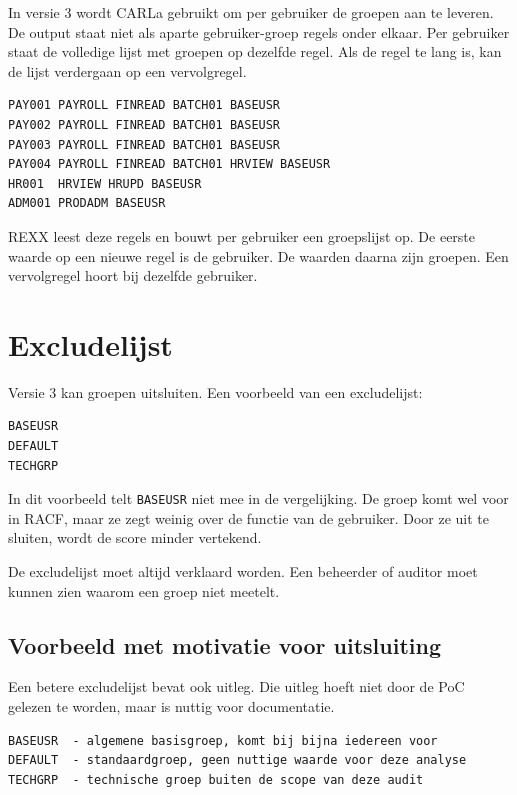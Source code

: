 In versie 3 wordt CARLa gebruikt om per gebruiker de groepen aan te leveren. De output staat niet als aparte gebruiker-groep regels onder elkaar. Per gebruiker staat de volledige lijst met groepen op dezelfde regel. Als de regel te lang is, kan de lijst verdergaan op een vervolgregel.

\begin{verbatim}
PAY001 PAYROLL FINREAD BATCH01 BASEUSR
PAY002 PAYROLL FINREAD BATCH01 BASEUSR
PAY003 PAYROLL FINREAD BATCH01 BASEUSR
PAY004 PAYROLL FINREAD BATCH01 HRVIEW BASEUSR
HR001  HRVIEW HRUPD BASEUSR
ADM001 PRODADM BASEUSR
\end{verbatim}

REXX leest deze regels en bouwt per gebruiker een groepslijst op. De eerste waarde op een nieuwe regel is de gebruiker. De waarden daarna zijn groepen. Een vervolgregel hoort bij dezelfde gebruiker.

\section{Excludelijst}

Versie 3 kan groepen uitsluiten. Een voorbeeld van een excludelijst:

\begin{verbatim}
BASEUSR
DEFAULT
TECHGRP
\end{verbatim}

In dit voorbeeld telt \texttt{BASEUSR} niet mee in de vergelijking. De groep komt wel voor in RACF, maar ze zegt weinig over de functie van de gebruiker. Door ze uit te sluiten, wordt de score minder vertekend.

De excludelijst moet altijd verklaard worden. Een beheerder of auditor moet kunnen zien waarom een groep niet meetelt.

\subsection*{Voorbeeld met motivatie voor uitsluiting}

Een betere excludelijst bevat ook uitleg. Die uitleg hoeft niet door de PoC gelezen te worden, maar is nuttig voor documentatie.

\begin{verbatim}
BASEUSR  - algemene basisgroep, komt bij bijna iedereen voor
DEFAULT  - standaardgroep, geen nuttige waarde voor deze analyse
TECHGRP  - technische groep buiten de scope van deze audit
\end{verbatim}

